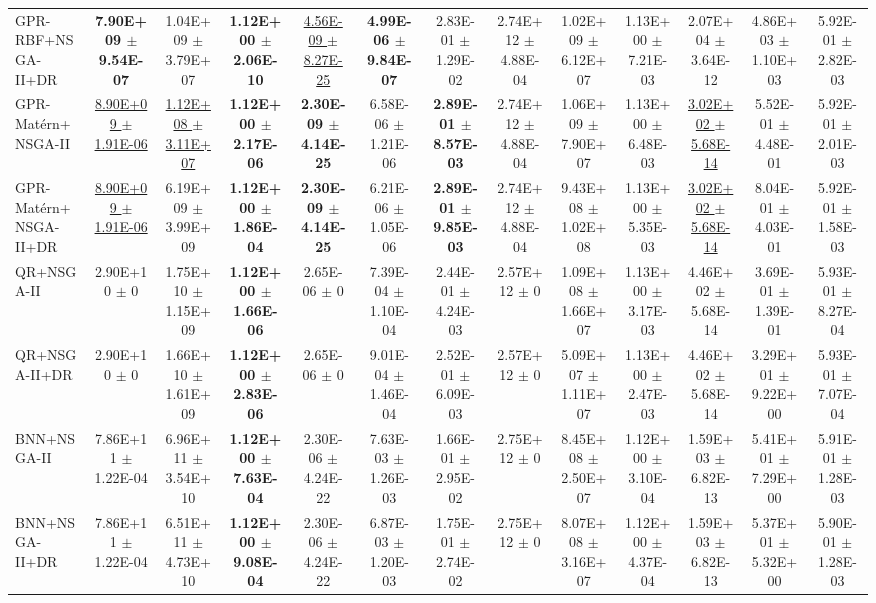 \documentclass[conference]{IEEEtran}
\begin{document}
\begin{table}[htbp]
{\begin{tabular}{lcccccccccccc}
GPR-RBF+NSGA-II+DR & \textbf{7.90E+09 $\pm$ 9.54E-07} & 1.04E+09 $\pm$ 3.79E+07 & \textbf{1.12E+00 $\pm$ 2.06E-10} & \underline{4.56E-09 $\pm$ 8.27E-25} & \textbf{4.99E-06 $\pm$ 9.84E-07} & 2.83E-01 $\pm$ 1.29E-02 & 2.74E+12 $\pm$ 4.88E-04 & 1.02E+09 $\pm$ 6.12E+07 & 1.13E+00 $\pm$ 7.21E-03 & 2.07E+04 $\pm$ 3.64E-12 & 4.86E+03 $\pm$ 1.10E+03 & 5.92E-01 $\pm$ 2.82E-03 \\
GPR-Mat\'ern+NSGA-II & \underline{8.90E+09 $\pm$ 1.91E-06} & \underline{1.12E+08 $\pm$ 3.11E+07} & \textbf{1.12E+00 $\pm$ 2.17E-06} & \textbf{2.30E-09 $\pm$ 4.14E-25} & 6.58E-06 $\pm$ 1.21E-06 & \textbf{2.89E-01 $\pm$ 8.57E-03} & 2.74E+12 $\pm$ 4.88E-04 & 1.06E+09 $\pm$ 7.90E+07 & 1.13E+00 $\pm$ 6.48E-03 & \underline{3.02E+02 $\pm$ 5.68E-14} & 5.52E-01 $\pm$ 4.48E-01 & 5.92E-01 $\pm$ 2.01E-03 \\
GPR-Mat\'ern+NSGA-II+DR & \underline{8.90E+09 $\pm$ 1.91E-06} & 6.19E+09 $\pm$ 3.99E+09 & \textbf{1.12E+00 $\pm$ 1.86E-04} & \textbf{2.30E-09 $\pm$ 4.14E-25} & 6.21E-06 $\pm$ 1.05E-06 & \textbf{2.89E-01 $\pm$ 9.85E-03} & 2.74E+12 $\pm$ 4.88E-04 & 9.43E+08 $\pm$ 1.02E+08 & 1.13E+00 $\pm$ 5.35E-03 & \underline{3.02E+02 $\pm$ 5.68E-14} & 8.04E-01 $\pm$ 4.03E-01 & 5.92E-01 $\pm$ 1.58E-03 \\
QR+NSGA-II & 2.90E+10 $\pm$ 0 & 1.75E+10 $\pm$ 1.15E+09 & \textbf{1.12E+00 $\pm$ 1.66E-06} & 2.65E-06 $\pm$ 0 & 7.39E-04 $\pm$ 1.10E-04 & 2.44E-01 $\pm$ 4.24E-03 & 2.57E+12 $\pm$ 0 & 1.09E+08 $\pm$ 1.66E+07 & 1.13E+00 $\pm$ 3.17E-03 & 4.46E+02 $\pm$ 5.68E-14 & 3.69E-01 $\pm$ 1.39E-01 & 5.93E-01 $\pm$ 8.27E-04 \\
QR+NSGA-II+DR & 2.90E+10 $\pm$ 0 & 1.66E+10 $\pm$ 1.61E+09 & \textbf{1.12E+00 $\pm$ 2.83E-06} & 2.65E-06 $\pm$ 0 & 9.01E-04 $\pm$ 1.46E-04 & 2.52E-01 $\pm$ 6.09E-03 & 2.57E+12 $\pm$ 0 & 5.09E+07 $\pm$ 1.11E+07 & 1.13E+00 $\pm$ 2.47E-03 & 4.46E+02 $\pm$ 5.68E-14 & 3.29E+01 $\pm$ 9.22E+00 & 5.93E-01 $\pm$ 7.07E-04 \\
BNN+NSGA-II & 7.86E+11 $\pm$ 1.22E-04 & 6.96E+11 $\pm$ 3.54E+10 & \textbf{1.12E+00 $\pm$ 7.63E-04} & 2.30E-06 $\pm$ 4.24E-22 & 7.63E-03 $\pm$ 1.26E-03 & 1.66E-01 $\pm$ 2.95E-02 & 2.75E+12 $\pm$ 0 & 8.45E+08 $\pm$ 2.50E+07 & 1.12E+00 $\pm$ 3.10E-04 & 1.59E+03 $\pm$ 6.82E-13 & 5.41E+01 $\pm$ 7.29E+00 & 5.91E-01 $\pm$ 1.28E-03 \\
BNN+NSGA-II+DR & 7.86E+11 $\pm$ 1.22E-04 & 6.51E+11 $\pm$ 4.73E+10 & \textbf{1.12E+00 $\pm$ 9.08E-04} & 2.30E-06 $\pm$ 4.24E-22 & 6.87E-03 $\pm$ 1.20E-03 & 1.75E-01 $\pm$ 2.74E-02 & 2.75E+12 $\pm$ 0 & 8.07E+08 $\pm$ 3.16E+07 & 1.12E+00 $\pm$ 4.37E-04 & 1.59E+03 $\pm$ 6.82E-13 & 5.37E+01 $\pm$ 5.32E+00 & 5.90E-01 $\pm$ 1.28E-03 \\

\end{tabular}}
\end{table}
\end{document}
